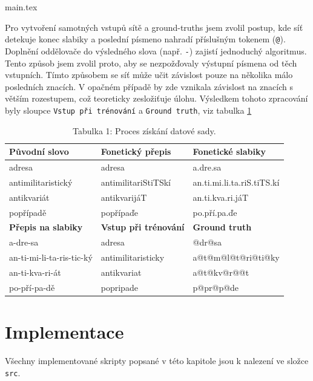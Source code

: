 main.tex\documentclass[a4paper]{article}
\theoremstyle{definition}
\begin{document}
Pro vytvoření samotných vstupů sítě a ground-truths jsem zvolil postup, kde síť detekuje konec slabiky a poslední písmeno nahradí příslušným tokenem (\texttt{@}). Doplnění oddělovače do výsledného slova (např. \texttt{-}) zajistí jednoduchý algoritmus. Tento způsob jsem zvolil proto, aby se nezpožďovaly výstupní písmena od těch vstupních. Tímto způsobem se síť může učit závislost pouze na několika málo posledních znacích. V opačném případě by zde vznikala závislost na znacích s větším rozestupem, což teoreticky zesložiťuje úlohu. Výsledkem tohoto zpracování byly sloupce \texttt{Vstup při trénování} a \texttt{Ground truth}, viz tabulka \ref{table:dataset}

\begin{table}[]
\centering
\caption{Tabulka 1: Proces získání datové sady.}
\begin{tabular}{|l|l|l|}
\hline
\textbf{Původní slovo}     & \textbf{Fonetický přepis}    & \textbf{Fonetické slabiky} \\ \hline
adresa                     & adresa                       & a.dre.sa                   \\ \hline
antimilitaristický         & antimilitariStiTSkí          & an.ti.mi.li.ta.riS.tiTS.kí \\ \hline
antikvariát                & antikvarijáT                 & an.ti.kva.ri.jáT           \\ \hline
popřípadě                  & popřípaďe                    & po.pří.pa.ďe               \\ \hline
\textbf{Přepis na slabiky} & \textbf{Vstup při trénování} & \textbf{Ground truth}      \\ \hline
a-dre-sa                   & adresa                       & @dr@sa                     \\ \hline
an-ti-mi-li-ta-ris-tic-ký  & antimilitaristicky           & a@t@m@l@t@ri@ti@ky         \\ \hline
an-ti-kva-ri-át            & antikvariat                  & a@t@kv@r@@t                \\ \hline
po-pří-pa-dě               & popripade                    & p@pr@p@de                  \\ \hline
\end{tabular}
\label{table:dataset}
\end{table}

\section{Implementace}
Všechny implementované skripty popsané v této kapitole jsou k nalezení ve složce \texttt{src}.
\end{document}
